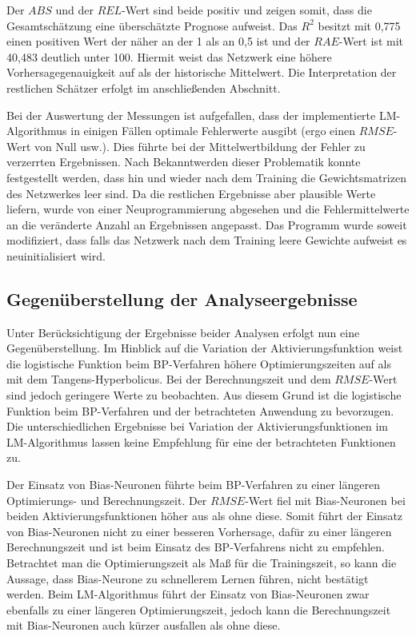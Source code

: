 Der $ABS$ und der $REL$-Wert sind beide positiv und zeigen somit, dass die Gesamtschätzung eine überschätzte Prognose aufweist. Das $R^2$ besitzt mit 0,775 einen positiven Wert der näher an der 1 als an 0,5 ist und der $RAE$-Wert ist mit 40,483 deutlich unter 100. Hiermit weist das Netzwerk eine höhere Vorhersagegenauigkeit auf als der historische Mittelwert. Die Interpretation der restlichen Schätzer erfolgt im anschließenden Abschnitt.



Bei der Auswertung der Messungen ist aufgefallen, dass der implementierte LM-Algorithmus in einigen Fällen optimale Fehlerwerte ausgibt (ergo einen $RMSE$-Wert von Null usw.). Dies führte bei der Mittelwertbildung der Fehler zu verzerrten Ergebnissen. Nach Bekanntwerden dieser Problematik konnte festgestellt werden, dass hin und wieder nach dem Training die Gewichtsmatrizen des Netzwerkes leer sind. Da die restlichen Ergebnisse aber plausible Werte liefern, wurde von einer Neuprogrammierung abgesehen und die Fehlermittelwerte an die veränderte Anzahl an Ergebnissen angepasst. Das Programm wurde soweit modifiziert, dass falls das Netzwerk nach dem Training leere Gewichte aufweist es neuinitialisiert wird.

\newpage

\subsection{Gegenüberstellung der Analyseergebnisse}\label{sec:geg_aus_alg}

Unter Berücksichtigung der Ergebnisse beider Analysen erfolgt nun eine Gegenüberstellung. Im Hinblick auf die Variation der Aktivierungsfunktion weist die logistische Funktion beim BP-Verfahren höhere Optimierungszeiten auf als mit dem Tangens-Hyperbolicus. Bei der Berechnungszeit und dem $RMSE$-Wert sind jedoch geringere Werte zu beobachten. Aus diesem Grund ist die logistische Funktion beim BP-Verfahren und der betrachteten Anwendung zu bevorzugen.
Die unterschiedlichen Ergebnisse bei Variation der Aktivierungsfunktionen im LM-Algorithmus lassen keine Empfehlung für eine der betrachteten Funktionen zu.\par\medskip

Der Einsatz von Bias-Neuronen führte beim BP-Verfahren zu einer längeren Optimierungs- und Berechnungszeit. Der $RMSE$-Wert fiel mit Bias-Neuronen bei beiden Aktivierungsfunktionen höher aus als ohne diese. Somit führt der Einsatz von Bias-Neuronen nicht zu einer besseren Vorhersage, dafür zu einer längeren Berechnungszeit und ist beim Einsatz des BP-Verfahrens nicht zu empfehlen. Betrachtet man die Optimierungszeit als Maß für die Trainingszeit, so kann die Aussage, dass Bias-Neurone zu schnellerem Lernen führen, nicht bestätigt werden.
Beim LM-Algorithmus führt der Einsatz von Bias-Neuronen zwar ebenfalls zu einer längeren Optimierungszeit, jedoch kann die Berechnungszeit mit Bias-Neuronen auch kürzer ausfallen als ohne diese.\par\medskip 


